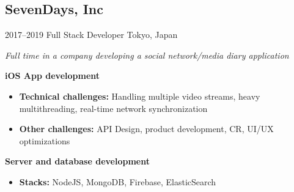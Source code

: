 \documentclass[]{template/friggeri-cv} %
\begin{document}
\subsection{SevenDays, Inc}
\begin{entrylist}


\entry
{2017--2019}
{Full Stack Developer}
{Tokyo, Japan}
{\emph{Full time in a company developing a social network/media diary application}

\textbf{iOS App development} 
\begin{itemize}
\item \textbf{Technical challenges:} Handling multiple video streams, heavy multithreading, real-time network synchronization
\item \textbf{Other challenges:} API Design, product development, CR, UI/UX optimizations
\end{itemize}
\textbf{Server and database development} 
\begin{itemize}
\item \textbf{Stacks:} NodeJS, MongoDB, Firebase, ElasticSearch

\end{itemize}


}
\end{entrylist}
\end{document}
